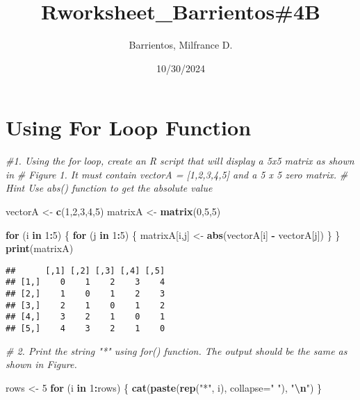 \documentclass[
]{article}
\title{Rworksheet\_Barrientos\#4B}
\author{Barrientos, Milfrance D.}
\date{10/30/2024}
\newenvironment{Shaded}{\begin{snugshade}}{\end{snugshade}}
\newcommand{\AttributeTok}[1]{\textcolor[rgb]{0.13,0.29,0.53}{#1}}
\newcommand{\CommentTok}[1]{\textcolor[rgb]{0.56,0.35,0.01}{\textit{#1}}}
\newcommand{\ControlFlowTok}[1]{\textcolor[rgb]{0.13,0.29,0.53}{\textbf{#1}}}
\newcommand{\DecValTok}[1]{\textcolor[rgb]{0.00,0.00,0.81}{#1}}
\newcommand{\FunctionTok}[1]{\textcolor[rgb]{0.13,0.29,0.53}{\textbf{#1}}}
\newcommand{\NormalTok}[1]{#1}
\newcommand{\OtherTok}[1]{\textcolor[rgb]{0.56,0.35,0.01}{#1}}
\newcommand{\SpecialCharTok}[1]{\textcolor[rgb]{0.81,0.36,0.00}{\textbf{#1}}}
\newcommand{\StringTok}[1]{\textcolor[rgb]{0.31,0.60,0.02}{#1}}
\begin{document}
\maketitle

\section{Using For Loop Function}\label{using-for-loop-function}

\begin{Shaded}
\begin{Highlighting}[]
\CommentTok{\#1. Using the for loop, create an R script that will display a 5x5 matrix as shown in}
\CommentTok{\# Figure 1. It must contain vectorA = [1,2,3,4,5] and a 5 x 5 zero matrix.}
\CommentTok{\# Hint Use abs() function to get the absolute value}

\NormalTok{vectorA }\OtherTok{\textless{}{-}} \FunctionTok{c}\NormalTok{(}\DecValTok{1}\NormalTok{,}\DecValTok{2}\NormalTok{,}\DecValTok{3}\NormalTok{,}\DecValTok{4}\NormalTok{,}\DecValTok{5}\NormalTok{)}
\NormalTok{matrixA }\OtherTok{\textless{}{-}} \FunctionTok{matrix}\NormalTok{(}\DecValTok{0}\NormalTok{,}\DecValTok{5}\NormalTok{,}\DecValTok{5}\NormalTok{)}

\ControlFlowTok{for}\NormalTok{ (i }\ControlFlowTok{in} \DecValTok{1}\SpecialCharTok{:}\DecValTok{5}\NormalTok{) \{}
  \ControlFlowTok{for}\NormalTok{ (j }\ControlFlowTok{in} \DecValTok{1}\SpecialCharTok{:}\DecValTok{5}\NormalTok{) \{}
\NormalTok{    matrixA[i,j] }\OtherTok{\textless{}{-}} \FunctionTok{abs}\NormalTok{(vectorA[i] }\SpecialCharTok{{-}}\NormalTok{ vectorA[j])}
\NormalTok{  \}}
\NormalTok{\}}
\FunctionTok{print}\NormalTok{(matrixA)}
\end{Highlighting}
\end{Shaded}

\begin{verbatim}
##      [,1] [,2] [,3] [,4] [,5]
## [1,]    0    1    2    3    4
## [2,]    1    0    1    2    3
## [3,]    2    1    0    1    2
## [4,]    3    2    1    0    1
## [5,]    4    3    2    1    0
\end{verbatim}

\begin{Shaded}
\begin{Highlighting}[]
\CommentTok{\# 2. Print the string "*" using for() function. The output should be the same as shown in Figure.}

\NormalTok{rows }\OtherTok{\textless{}{-}} \DecValTok{5} 
\ControlFlowTok{for}\NormalTok{ (i }\ControlFlowTok{in} \DecValTok{1}\SpecialCharTok{:}\NormalTok{rows) \{}
\FunctionTok{cat}\NormalTok{(}\FunctionTok{paste}\NormalTok{(}\FunctionTok{rep}\NormalTok{(}\StringTok{"*"}\NormalTok{, i), }\AttributeTok{collapse=}\StringTok{" "}\NormalTok{), }\StringTok{"}\SpecialCharTok{\textbackslash{}n}\StringTok{"}\NormalTok{)}
\NormalTok{\}}
\end{Highlighting}
\end{Shaded}
\end{document}
